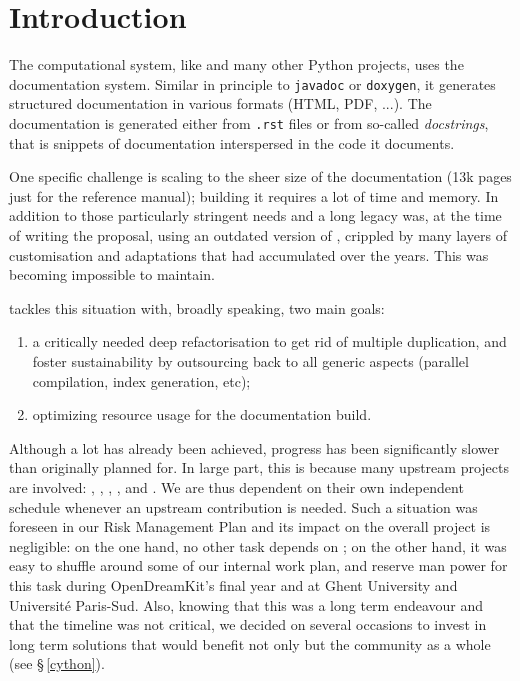 \documentclass{deliverablereport}
\author{Jeroen Demeyer}
\begin{document}
\maketitle
\tableofcontents


\section{Introduction}

The \Sage computational system, like \Python and many other Python
projects, uses the \Sphinx documentation system. Similar in principle
to \lstinline{javadoc} or \lstinline{doxygen}, it generates structured
documentation in various formats (HTML, PDF, ...).
The documentation is generated either from \texttt{.rst} files
or from so-called \emph{docstrings}, that is snippets of documentation
interspersed in the code it documents.

One specific challenge is scaling to the sheer size of the \Sage
documentation (13k pages just for the reference manual); building it
requires a lot of time and memory. In addition to those particularly
stringent needs and a long legacy \Sage was, at the time of writing
the proposal, using an outdated version of \Sphinx, crippled by many
layers of customisation and adaptations that had accumulated over the
years. This was becoming impossible to maintain.

 tackles this situation with, broadly
speaking, two main goals:
\begin{enumerate}
\item a critically needed deep refactorisation to get rid of multiple
  duplication, and foster sustainability by outsourcing back to
  \Sphinx all generic aspects (parallel compilation, index generation,
  etc);
\item optimizing resource usage for the documentation build.
\end{enumerate}

Although a lot has already been achieved, progress has been
significantly slower than originally planned for. In large part, this
is because many upstream projects are involved: \Sphinx, \Docutils,
\Pygments, \Cython, and \Python. We are thus dependent on their own
independent schedule whenever an upstream contribution is needed. Such
a situation was foreseen in our Risk Management Plan and its impact on
the overall project is negligible: on the one hand, no other task
depends on ; on the other hand, it was easy to
shuffle around some of our internal work plan, and reserve man power
for this task during OpenDreamKit's final year and at Ghent University
and Université Paris-Sud. Also, knowing that this was a long term
endeavour and that the timeline was not critical, we decided on
several occasions to invest in long term solutions that would benefit
not only \Sage but the community as a whole (see \S\,\ref{cython}).
\end{document}
